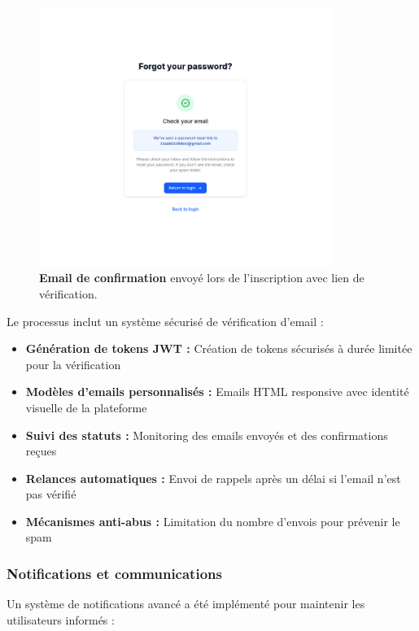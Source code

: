 \begin{figure}[h!]
  \centering
  \includegraphics[width=0.85\textwidth,keepaspectratio]{old-reports/week_4_img/sended.jpeg}
  \caption{\textbf{Email de confirmation} envoyé lors de l'inscription avec lien de vérification.}
  \label{fig:confirmation_email}
\end{figure}

Le processus inclut un système sécurisé de vérification d'email :
\begin{itemize}
  \item \textbf{Génération de tokens JWT :} Création de tokens sécurisés à durée limitée pour la vérification
  \item \textbf{Modèles d'emails personnalisés :} Emails HTML responsive avec identité visuelle de la plateforme
  \item \textbf{Suivi des statuts :} Monitoring des emails envoyés et des confirmations reçues
  \item \textbf{Relances automatiques :} Envoi de rappels après un délai si l'email n'est pas vérifié
  \item \textbf{Mécanismes anti-abus :} Limitation du nombre d'envois pour prévenir le spam
\end{itemize}

\subsubsection{Notifications et communications}

Un système de notifications avancé a été implémenté pour maintenir les utilisateurs informés :

